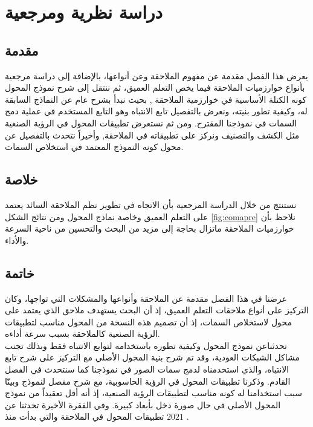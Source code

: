\chapter{دراسة نظرية ومرجعية}
\section{مقدمة}
يعرض هذا الفصل مقدمة عن مفهوم الملاحقة وعن أنواعها، بالإضافة إلى دراسة مرجعية بأنواع خوارزميات الملاحقة فيما يخص التعلم العميق، ثم ننتقل إلى شرح نموذج المحول كونه الكتلة الأساسية في خوارزمية الملاحقة 
,
بحيث نبدأ بشرح عام عن النماذج السابقة له، وكيفية تطور بنيته، ونعرض بالتفصيل تابع الانتباه وهو التابع المستخدم في عملية دمج السمات في نموذجنا المقترح.
ومن ثم نستعرض تطبيقات المحول في الرؤية الصنعية مثل الكشف والتصنيف ونركز على تطبيقاته في الملاحقة, وأخيراً نتحدث بالتفصيل عن محول 
كونه النموذج المعتمد في استخلاص السمات.








\section{خلاصة}
نستنتج من خلال الدراسة المرجعية بأن الاتجاه في تطوير نظم الملاحقة السائد يعتمد على التعلم العميق وخاصة نماذج المحول
ومن نتائج الشكل 
\ref{fig:comapre}
نلاحظ بأن خوارزميات الملاحقة ماتزال بحاجة إلى مزيد من البحث والتحسين من ناحية السرعة والأداء.
\section{خاتمة}
عرضنا في هذا الفصل مقدمة عن الملاحقة وأنواعها والمشكلات التي تواجها، وكان التركيز على أنواع ملاحقات التعلم العميق، إذ أن البحث يستهدف ملاحق 
الذي يعتمد على محول
لاستخلاص السمات، إذ أن تصميم هذه النسخة من المحول مناسب لتطبيقات الرؤية الصنعية كالملاحقة بسبب سرعة أداءه.
\\
تحدثناعن نموذج المحول وكيفية تطوره باستخدامه لتوابع الانتباه فقط وبذلك تجنب مشاكل الشبكات العودية، وقد تم شرح بنية المحول الأصلي مع التركيز على شرح تابع الانتباه، والذي استخدمناه لدمج سمات الصور في نموذجنا كما سنتحدث في الفصل القادم. وذكرنا تطبيقات المحول في الرؤية الحاسوبية، مع شرح مفصل لنموذج
وبينّا سبب استخدامنا له كونه مناسب لتطبيقات الرؤية الصنعية، إذ أنه أقل تعقيداً من نموذج المحول الأصلي في حال صورة دخل بأبعاد كبيرة.
وفي الفقرة الأخيرة تحدثنا عن تطبيقات المحول في  الملاحقة والتي بدأت منذ $2021$ .










